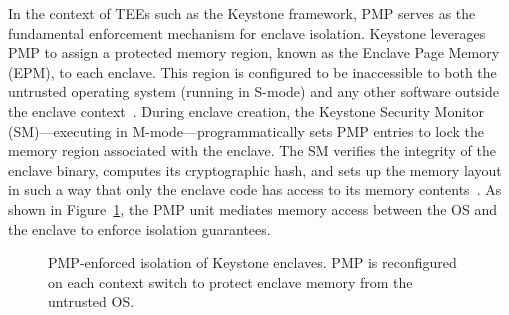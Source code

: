 In the context of TEEs such as the Keystone framework, PMP serves as the fundamental enforcement mechanism for enclave isolation. Keystone leverages PMP to assign a protected memory region, known as the Enclave Page Memory (EPM), to each enclave. This region is configured to be inaccessible to both the untrusted operating system (running in S-mode) and any other software outside the enclave context~\cite{Lee2019}. During enclave creation, the Keystone Security Monitor (SM)—executing in M-mode—programmatically sets PMP entries to lock the memory region associated with the enclave. The SM verifies the integrity of the enclave binary, computes its cryptographic hash, and sets up the memory layout in such a way that only the enclave code has access to its memory contents~\cite{Lee2019,keystone2025how}.
As shown in Figure~\ref{fig:pmp-keystone}, the PMP unit mediates memory access between the OS and the enclave to enforce isolation guarantees.

\begin{figure}[htbp]
\centering
{}
\caption{PMP-enforced isolation of Keystone enclaves. PMP is reconfigured on each context switch to protect enclave memory from the untrusted OS.}
\label{fig:pmp-keystone}
\end{figure}


